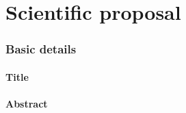 \documentclass[a4paper,10pt,fleqn]{application}
\begin{document}




\part{Scientific proposal}

\section{Basic details}
\vspace{\baselineskip}

\subsection{Title}


\subsection{Abstract}
\end{document}
